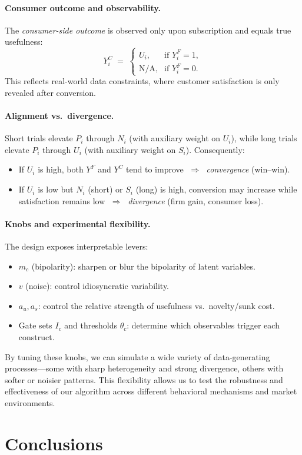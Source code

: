 \documentclass[11pt,letterpaper,english]{article}
\theoremstyle{definition}
\theoremstyle{definition}
\begin{document}
\begin{bibunit}
\paragraph{Consumer outcome and observability.}
The \emph{consumer-side outcome} is observed only upon subscription and equals true usefulness:
\[
Y_i^C \;=\; 
\begin{cases}
U_i, & \text{if } Y_i^F=1,\\
\text{N/A}, & \text{if } Y_i^F=0.
\end{cases}
\]
This reflects real-world data constraints, where customer satisfaction is only revealed after conversion.

\paragraph{Alignment vs.\ divergence.}
Short trials elevate $P_i$ through $N_i$ (with auxiliary weight on $U_i$), while long trials elevate $P_i$ through $U_i$ (with auxiliary weight on $S_i$). Consequently:
\begin{itemize}
    \item If $U_i$ is high, both $Y^F$ and $Y^C$ tend to improve $\;\Rightarrow\;$ \emph{convergence} (win--win).
    \item If $U_i$ is low but $N_i$ (short) or $S_i$ (long) is high, conversion may increase while satisfaction remains low $\;\Rightarrow\;$ \emph{divergence} (firm gain, consumer loss).
\end{itemize}

\paragraph{Knobs and experimental flexibility.}
The design exposes interpretable levers:
\begin{itemize}
    \item $m_c$ (bipolarity): sharpen or blur the bipolarity of latent variables.
    \item $v$ (noise): control idiosyncratic variability.
    \item $a_u,a_s$: control the relative strength of usefulness vs.\ novelty/sunk cost.
    \item Gate sets $I_c$ and thresholds $\theta_c$: determine which observables trigger each construct.
\end{itemize}
By tuning these knobs, we can simulate a wide variety of data-generating processes—some with sharp heterogeneity and strong divergence, others with softer or noisier patterns. This flexibility allows us to test the robustness and effectiveness of our algorithm across different behavioral mechanisms and market environments.




\section{Conclusions}
\label{sec:conclusion}



\newpage
\renewcommand{\baselinestretch}{1.0} 
\putbib


\end{bibunit}
\end{document}
